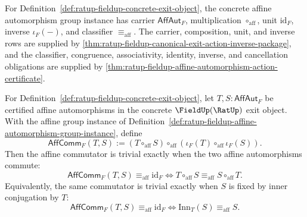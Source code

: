 \begin{definition}
\label{def:ratup-fieldup-affine-automorphism-group-instance}
For Definition~\ref{def:ratup-fieldup-concrete-exit-object}, the concrete
affine automorphism group instance has carrier $\mathsf{AffAut}_F$,
multiplication $\circ_{\mathrm{aff}}$, unit $\mathrm{id}_F$, inverse
$\iota_F(-)$, and classifier $\equiv_{\mathrm{aff}}$. The carrier,
composition, unit, and inverse rows are supplied by
\autoref{thm:ratup-fieldup-canonical-exit-action-inverse-package}, and the
classifier, congruence, associativity, identity, inverse, and cancellation
obligations are supplied by
\autoref{thm:ratup-fieldup-affine-automorphism-action-certificate}.
\end{definition}

\begin{theorem}
\label{thm:ratup-fieldup-affine-commutator-fixedness}
For Definition~\ref{def:ratup-fieldup-concrete-exit-object}, let
$T,S:\mathsf{AffAut}_F$ be certified affine automorphisms in the concrete
$\FieldUp(\RatUp)$ exit object. With the affine group instance of
Definition~\ref{def:ratup-fieldup-affine-automorphism-group-instance}, define
$$
\mathsf{AffComm}_F(T,S):=(T\circ_{\mathrm{aff}}S)\circ_{\mathrm{aff}}
(\iota_F(T)\circ_{\mathrm{aff}}\iota_F(S)).
$$
Then the affine commutator is trivial exactly when the two affine
automorphisms commute:
$$
\mathsf{AffComm}_F(T,S)\equiv_{\mathrm{aff}}\mathrm{id}_F
\Longleftrightarrow
T\circ_{\mathrm{aff}}S\equiv_{\mathrm{aff}}S\circ_{\mathrm{aff}}T.
$$
Equivalently, the same commutator is trivial exactly when $S$ is fixed by
inner conjugation by $T$:
$$
\mathsf{AffComm}_F(T,S)\equiv_{\mathrm{aff}}\mathrm{id}_F
\Longleftrightarrow
\mathrm{Inn}_T(S)\equiv_{\mathrm{aff}}S.
$$
\end{theorem}
